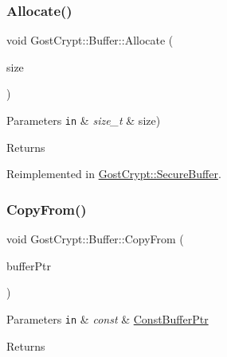 \subsubsection{\texorpdfstring{Allocate()}{Allocate()}}
{\footnotesize\ttfamily void Gost\+Crypt\+::\+Buffer\+::\+Allocate (\begin{DoxyParamCaption}\item[{size\+\_\+t}]{size }\end{DoxyParamCaption})\hspace{0.3cm}{\ttfamily [virtual]}}


\begin{DoxyParams}[1]{Parameters}
\mbox{\tt in}  & {\em size\+\_\+t} & size) \\
\hline
\end{DoxyParams}
\begin{DoxyReturn}{Returns}

\end{DoxyReturn}


Reimplemented in \hyperlink{class_gost_crypt_1_1_secure_buffer_a626b41ebc4eec26e6968bcead2f26966}{Gost\+Crypt\+::\+Secure\+Buffer}.

\mbox{\label{class_gost_crypt_1_1_buffer_ab6437b9384e750a70b72b5d726f870dd}} 
\subsubsection{\texorpdfstring{Copy\+From()}{CopyFrom()}}
{\footnotesize\ttfamily void Gost\+Crypt\+::\+Buffer\+::\+Copy\+From (\begin{DoxyParamCaption}\item[{const \hyperlink{class_gost_crypt_1_1_const_buffer_ptr}{Const\+Buffer\+Ptr} \&}]{buffer\+Ptr }\end{DoxyParamCaption})\hspace{0.3cm}{\ttfamily [virtual]}}


\begin{DoxyParams}[1]{Parameters}
\mbox{\tt in}  & {\em const} & \hyperlink{class_gost_crypt_1_1_const_buffer_ptr}{Const\+Buffer\+Ptr} \\
\hline
\end{DoxyParams}
\begin{DoxyReturn}{Returns}

\end{DoxyReturn}
\mbox{\label{class_gost_crypt_1_1_buffer_ad9835ef686d5123d3ac022fceeaa9529}} 

